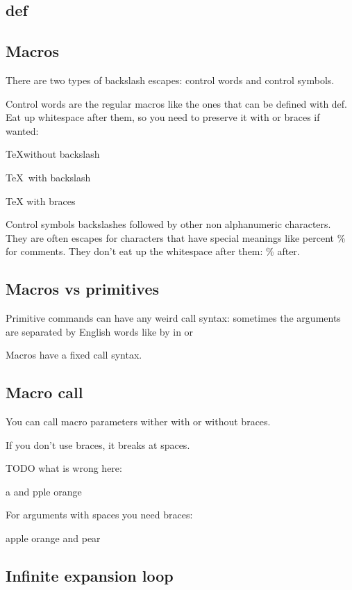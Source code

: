   \subsection{def}

  \subsection{Macros}

    There are two types of backslash escapes: control words and control symbols.

    Control words are the regular macros like the ones that can be defined with \bs def. Eat up whitespace after them, so you need to preserve it with \bs or braces if wanted:

    \TeX without backslash

    \TeX\ with backslash

    \TeX{} with braces

    Control symbols backslashes followed by other non alphanumeric characters. They are often escapes for characters that have special meanings like percent \% for comments. They don't eat up the whitespace after them: \% after.

    \subsection{Macros vs primitives}

      Primitive commands can have any weird call syntax: sometimes the arguments are separated by English words like by in  or 

      Macros have a fixed call syntax.

    \subsection{Macro call}

      You can call macro parameters wither with or without braces.

      If you don't use braces, it breaks at spaces.

      \def\f#1#2{#1 and #2}

      TODO what is wrong here:

      \f apple orange

      For arguments with spaces you need braces:

      \f{apple orange}{pear}

    \subsection{Infinite expansion loop}

